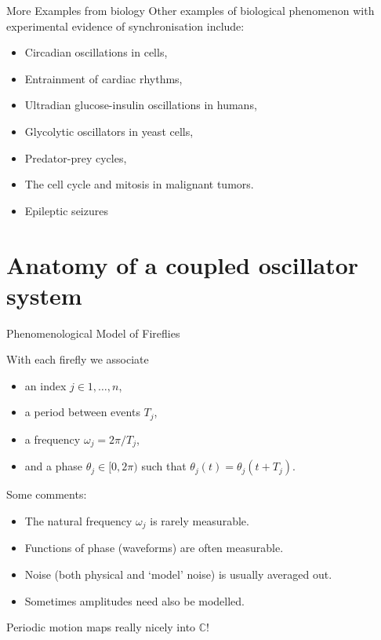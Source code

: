 \documentclass[10pt,reqno]{beamer}
\newcommand{\complex}{\mathbb{C}}
\begin{document}
\begin{frame}{More Examples from biology}
Other examples of biological phenomenon with experimental evidence of synchronisation include\cite{synch}:
\begin{itemize}
	\item Circadian oscillations in cells,
	\item Entrainment of cardiac rhythms,
	\item Ultradian glucose-insulin oscillations in humans,
	\item Glycolytic oscillators in yeast cells,
	\item Predator-prey cycles,
	\item The cell cycle and mitosis in malignant tumors.
	\item Epileptic seizures
\end{itemize}
\end{frame}
\section{Anatomy of a coupled oscillator system}
\begin{frame}{Phenomenological Model of Fireflies}
\begin{minipage}{0.46\textwidth}
\begin{figure}
\end{figure}
\end{minipage}\hfill
\begin{minipage}{0.46\textwidth}
With each firefly we associate
\begin{itemize}
	\item an index $j \in 1,\ldots,n$, 
	\item a period between events $T_j$,
	\item a frequency $\omega_j = 2\pi/T_j$,
	\item and a phase $\theta_j \in [0,2\pi)$  such that $\theta_j(t) = \theta_j(t+T_j)$.
\end{itemize}
\end{minipage}

\vspace{15pt}

Some comments:
\begin{itemize}
	\item The natural frequency $\omega_j$ is rarely measurable.
	\item Functions of phase (waveforms) are often measurable.
	\item Noise (both physical and `model' noise) is usually averaged out.
	\item Sometimes amplitudes need also be modelled.
\end{itemize}

\begin{center}
	\vfill
Periodic motion maps really nicely into $\complex$!
\end{center}
\end{frame}
\end{document}
